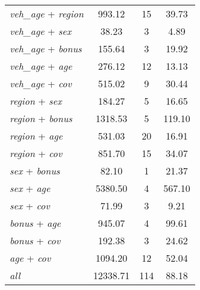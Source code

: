 {\begin{ThreePartTable}
\begin{longtable}{lccc}
    \textit{veh\_age} + \textit{region} &   993.12 &       15 &    39.73 \\
    \textit{veh\_age} + \textit{sex} &    38.23 &        3 &     4.89 \\
    \textit{veh\_age} + \textit{bonus} &   155.64 &        3 &    19.92 \\
    \textit{veh\_age} + \textit{age} &   276.12 &       12 &    13.13 \\
    \textit{veh\_age} + \textit{cov} &   515.02 &        9 &    30.44 \\
    \textit{region} + \textit{sex} &   184.27 &        5 &    16.65 \\
    \textit{region} + \textit{bonus} &  1318.53 &        5 &   119.10 \\
    \textit{region} + \textit{age} &   531.03 &       20 &    16.91 \\
    \textit{region} + \textit{cov} &   851.70 &       15 &    34.07 \\
    \textit{sex} + \textit{bonus} &    82.10 &        1 &    21.37 \\
    \textit{sex} + \textit{age} &  5380.50 &        4 &   567.10 \\
    \textit{sex} + \textit{cov} &    71.99 &        3 &     9.21 \\
    \textit{bonus} + \textit{age} &   945.07 &        4 &    99.61 \\
    \textit{bonus} + \textit{cov} &   192.38 &        3 &    24.62 \\
    \textit{age} + \textit{cov} &  1094.20 &       12 &    52.04 \\
    \textit{all}\tnote{\ddag} & 12338.71 &      114 &    88.18 \\

\end{longtable}
\end{ThreePartTable}
}
